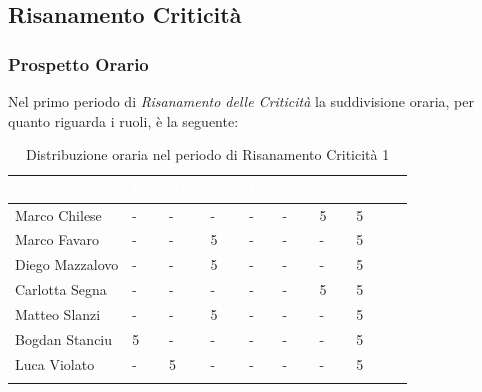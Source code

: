 \newpage
\subsection{Risanamento Criticità}
\label{PRC1}
\subsubsection{Prospetto Orario}

Nel primo periodo di \textit{Risanamento delle Criticità} la suddivisione oraria, per quanto riguarda i ruoli, è la seguente:

\begin{longtable}{|C{.30\textwidth}|C{.06\textwidth}|C{.06\textwidth}|C{.06\textwidth} | C{.06\textwidth}| C{.06\textwidth} | C{.06\textwidth} | C{.10\textwidth} |}
\hline
{}	\textbf{\textcolor{white}{Nome}} & \textbf{\textcolor{white}{RE}} & \textbf{\textcolor{white}{AM}} & \textbf{\textcolor{white}{AN}} & \textbf{\textcolor{white}{PJ}} & \textbf{\textcolor{white}{PR}} & \textbf{\textcolor{white}{VE}} & \textbf{\textcolor{white}{Totale}}\\
\hline 
Marco Chilese & - & - & - & - & - & 5 & 5 \\
\hline
{}Marco Favaro & - & - & 5 & - & - & - & 5 \\
\hline
Diego Mazzalovo & - & - & 5 & - & - & - & 5 \\
\hline
{}Carlotta Segna & - & - & - & - & - & 5 & 5 \\
\hline
Matteo Slanzi & - & - & 5 & - & - & - & 5 \\
\hline
{}Bogdan Stanciu & 5 & - & - & - & - & - & 5 \\
\hline
Luca Violato & - & 5 & - & - & - & - & 5 \\
\hline

\caption{Distribuzione oraria nel periodo di Risanamento Criticità 1}
\label{Distribuzione oraria del periodo di rc1}
\end{longtable}



